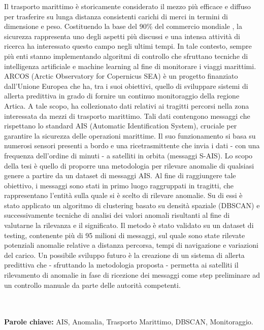 \documentclass{Configuration_Files/PoliMi3i_thesis}
\begin{document}
Il trasporto marittimo è storicamente considerato il mezzo più efficace e diffuso per trasferire su lunga distanza consistenti carichi di merci in termini di dimensione e peso. Costituendo la base del 90\% del commercio mondiale \cite{trasporto-marittimo}, la sicurezza rappresenta uno degli aspetti più discussi e una intensa attività di ricerca ha interessato questo campo negli ultimi tempi.  
In tale contesto, sempre più enti stanno implementando algoritmi di controllo che sfruttano tecniche di intelligenza artificiale e machine learning al fine di monitorare i viaggi marittimi. ARCOS (Arctic Observatory for Copernicus SEA) è un progetto finanziato dall'Unione Europea che ha, tra i suoi obiettivi, quello di sviluppare sistemi di allerta predittiva in grado di fornire un continuo monitoraggio della regione Artica. A tale scopo, ha collezionato dati relativi ai tragitti percorsi nella zona interessata da mezzi di trasporto marittimo. Tali dati contengono messaggi che rispettano lo standard AIS (Automatic Identification System), cruciale per garantire la sicurezza delle operazioni marittime. Il suo funzionamento si basa su numerosi sensori presenti a bordo e una ricetrasmittente che invia i dati - con una frequenza dell’ordine di minuti - a satelliti in orbita (messaggi S-AIS). Lo scopo della tesi è quello di proporre una metodologia per rilevare anomalie di qualsiasi genere a partire da un dataset di messaggi AIS. Al fine di raggiungere tale obiettivo, i messaggi sono stati in primo luogo raggruppati in tragitti, che rappresentano l'entità sulla quale si è scelto di rilevare anomalie. Su di essi è stato applicato un algoritmo di clustering basato su densità spaziale (DBSCAN) e successivamente tecniche di analisi dei valori anomali risultanti al fine di valutarne la rilevanza e il significato. Il metodo è stato validato su un dataset di testing, contenente più di 95 milioni di messaggi, sul quale sono state rilevate potenziali anomalie relative a distanza percorsa, tempi di navigazione e variazioni del carico. Un possibile sviluppo futuro è la creazione di un sistema di allerta predittiva che - sfruttando la metodologia proposta - permetta ai satelliti il rilevamento di anomalie in fase di ricezione dei messaggi come step preliminare ad un controllo manuale da parte delle autorità competenti.

\\
\\
\textbf{Parole chiave:} AIS, Anomalia, Trasporto Marittimo, DBSCAN, Monitoraggio.

\end{document}
